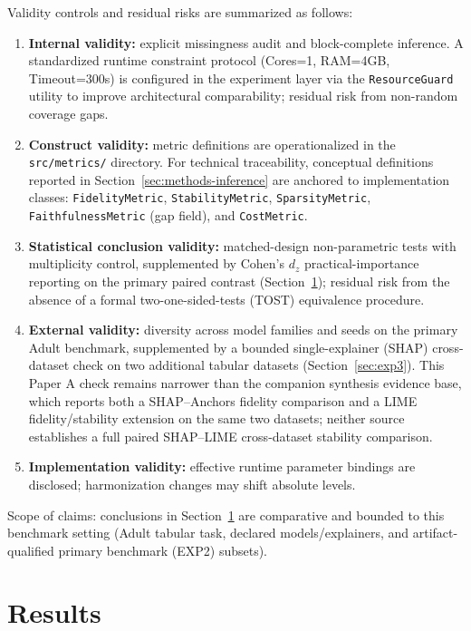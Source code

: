 \documentclass[twoside,11pt]{article}
\begin{document}
Validity controls and residual risks are summarized as follows:
\begin{enumerate}[leftmargin=*]
    \item \textbf{Internal validity:} explicit missingness audit and
    block-complete inference. A standardized runtime constraint protocol 
    (Cores=1, RAM=4GB, Timeout=300s) is configured in the experiment layer via
    the \texttt{ResourceGuard} utility to improve architectural comparability;
    residual risk from non-random coverage gaps.
    \item \textbf{Construct validity:} metric definitions are operationalized in the \texttt{src/metrics/} directory. For technical traceability, conceptual definitions reported in Section~\ref{sec:methods-inference} are anchored to implementation classes: \texttt{FidelityMetric}, \texttt{StabilityMetric}, \texttt{SparsityMetric}, \texttt{FaithfulnessMetric} (gap field), and \texttt{CostMetric}.
    \item \textbf{Statistical conclusion validity:} matched-design non-parametric
    tests with multiplicity control, supplemented by Cohen's $d_z$
    practical-importance reporting on the primary paired contrast
    (Section~\ref{sec:results}); residual risk from the absence of a formal
    two-one-sided-tests (TOST) equivalence procedure.
    \item \textbf{External validity:} diversity across model families and seeds
    on the primary Adult benchmark, supplemented by a bounded single-explainer
    (SHAP) cross-dataset check on two additional tabular datasets
    (Section~\ref{sec:exp3}). This Paper A check remains narrower than the
    companion synthesis evidence base, which reports both a SHAP--Anchors
    fidelity comparison and a LIME fidelity/stability extension on the same two
    datasets; neither source establishes a full paired SHAP--LIME
    cross-dataset stability comparison.
    \item \textbf{Implementation validity:} effective runtime parameter bindings
    are disclosed; harmonization changes may shift absolute levels.
\end{enumerate}

Scope of claims: conclusions in Section~\ref{sec:results} are comparative and bounded to this
benchmark setting (Adult tabular task, declared models/explainers, and
artifact-qualified primary benchmark (EXP2) subsets).

\section{Results}
\label{sec:results}
\end{document}
